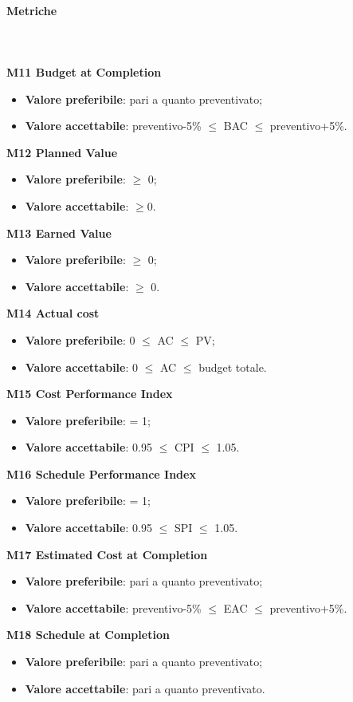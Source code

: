 			\paragraph{Metriche} \mbox{} \\ \\
			\textbf{M11 Budget at Completion}
			\begin{itemize}
				\item \textbf{Valore preferibile}: pari a quanto preventivato;
				\item \textbf{Valore accettabile}: preventivo-5\% $\le$ BAC $\le$ preventivo+5\%.
			\end{itemize}
			\textbf{M12 Planned Value}
			\begin{itemize}
				\item \textbf{Valore preferibile}: $\ge$ 0;
				\item \textbf{Valore accettabile}: $\ge$0.
			\end{itemize}
			\textbf{M13 Earned Value}
			\begin{itemize}
				\item \textbf{Valore preferibile}: $\ge$ 0;
				\item \textbf{Valore accettabile}: $\ge$ 0.
			\end{itemize}
			\textbf{M14 Actual cost}
			\begin{itemize}
				\item \textbf{Valore preferibile}: 0 $\le$ AC $\le$ PV;
				\item \textbf{Valore accettabile}: 0 $\le$ AC $\le$ budget totale.
			\end{itemize}
			\textbf{M15 Cost Performance Index}
			\begin{itemize}
				\item \textbf{Valore preferibile}: = 1;
				\item \textbf{Valore accettabile}: 0.95 $\le$ CPI $\le$ 1.05.
			\end{itemize}
			\textbf{M16 Schedule Performance Index}
			\begin{itemize}
				\item \textbf{Valore preferibile}: = 1;
				\item \textbf{Valore accettabile}: 0.95 $\le$ SPI $\le$ 1.05.
			\end{itemize}
			\textbf{M17 Estimated Cost at Completion}
			\begin{itemize}
				\item \textbf{Valore preferibile}: pari a quanto preventivato;
				\item \textbf{Valore accettabile}: preventivo-5\% $\le$ EAC $\le$ preventivo+5\%.
			\end{itemize}
			\textbf{M18 Schedule at Completion}
			\begin{itemize}
				\item \textbf{Valore preferibile}: pari a quanto preventivato;
				\item \textbf{Valore accettabile}: pari a quanto preventivato.
			\end{itemize}
		

